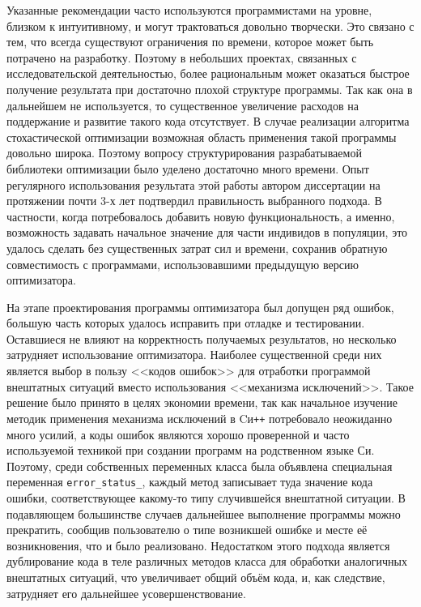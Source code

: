 Указанные рекомендации часто используются программистами на уровне,
близком к интуитивному, и могут трактоваться довольно творчески.  Это
связано с тем, что всегда существуют ограничения по времени, которое
может быть потрачено на разработку. Поэтому в небольших проектах,
связанных с исследовательской деятельностью, более рациональным может
оказаться быстрое получение результата при достаточно плохой структуре
программы. Так как она в дальнейшем не используется, то существенное
увеличение расходов на поддержание и развитие такого кода
отсутствует. В случае реализации алгоритма стохастической оптимизации
возможная область применения такой программы довольно широка. Поэтому
вопросу структурирования разрабатываемой библиотеки оптимизации было
уделено достаточно много времени.  Опыт регулярного использования
результата этой работы автором диссертации на протяжении почти 3-х лет подтвердил
правильность выбранного подхода.  В частности, когда потребовалось
добавить новую функциональность, а именно, возможность задавать
начальное значение для части индивидов в популяции, это удалось
сделать без существенных затрат сил и времени, сохранив обратную
совместимость с программами, использовавшими предыдущую версию
оптимизатора.

На этапе проектирования программы оптимизатора был допущен ряд ошибок,
большую часть которых удалось исправить при отладке и
тестировании. Оставшиеся не влияют на корректность получаемых
результатов, но несколько затрудняет использование оптимизатора.
Наиболее существенной среди них является выбор в пользу <<кодов
ошибок>> для отработки программой внештатных ситуаций вместо
использования <<механизма исключений>>.  Такое решение было принято в
целях экономии времени, так как начальное изучение методик применения
механизма исключений в Cи\texttt{++} потребовало неожиданно много
усилий, а коды ошибок являются хорошо проверенной и часто используемой
техникой при создании программ на родственном языке Си. Поэтому, среди
собственных переменных класса была объявлена специальная переменная
\verb+error_status_+, каждый метод записывает туда
значение кода ошибки, соответствующее какому-то типу случившейся
внештатной ситуации.  В подавляющем большинстве случаев дальнейшее
выполнение программы можно прекратить, сообщив пользователю о типе
возникшей ошибке и месте её возникновения, что и было
реализовано. Недостатком этого подхода является дублирование кода в
теле различных методов класса для обработки аналогичных внештатных
ситуаций, что увеличивает общий объём кода, и, как следствие,
затрудняет его дальнейшее усовершенствование.


